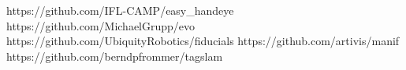 \expandafter\def\csname repourl@easy_handeye\endcsname{https://github.com/IFL-CAMP/easy_handeye}
\expandafter\def\csname repourl@evo\endcsname{https://github.com/MichaelGrupp/evo}
\expandafter\def\csname repourl@fiducials\endcsname{https://github.com/UbiquityRobotics/fiducials}
\expandafter\def\csname repourl@manif\endcsname{https://github.com/artivis/manif}
\expandafter\def\csname repourl@tagslam\endcsname{https://github.com/berndpfrommer/tagslam}
\makeatletter
\newcommand{\repo}[2][]{%
  \IfSubStr{#2}{/}%
    {\href{https://github.com/#2}{\texttt{\color{steel}#2}}}%
    {\ifx\relax#1\relax
       \StrSubstitute{#2}{\_}{_}[\reponame]%
       \@ifundefined{repourl@\reponame}%
         {\texttt{#2}}%
         {\href{\csname repourl@\reponame\endcsname}{\texttt{\color{steel}#2}}}%
     \else \href{#1}{\texttt{\color{steel}#2}}\fi}}
\makeatother
\newcommand{\T}[1]{{\footnotesize\sffamily\color{tiercol}[T#1]}}
\newcommand{\dependency}[1]{%
  \par\vspace{0.15em}\noindent
  \hangindent=1.0em\hangafter=1
  {\footnotesize\sffamily\bfseries\color{white}\colorbox{tiercol}{\vphantom{Ag}PHỤ THUỘC}}\hspace{0.5em}%
  {\footnotesize\sffamily\color{tiercol}#1}\par\vspace{0.7em}}
\newenvironment{tukiem}{\par\medskip\bmblock{Câu hỏi tự kiểm}%
  {\raisebox{0.06em}{\color{accent}\rule{2.6pt}{0.82em}}\hspace{0.5em}%
   \sffamily\bfseries\color{inkblue}Câu hỏi tự kiểm}%
  {\sffamily\small\color{tiercol}\ \ (trả lời không nhìn bài)}%
  \begin{enumerate}[label=\arabic*.,leftmargin=1.7em]}{\end{enumerate}}

\newcommand{\muc}[1]{{\color{accent}\ifcase#1\or\(\bullet\)\or\(\bullet\bullet\)\or\(\bullet\bullet\bullet\)\fi}}

